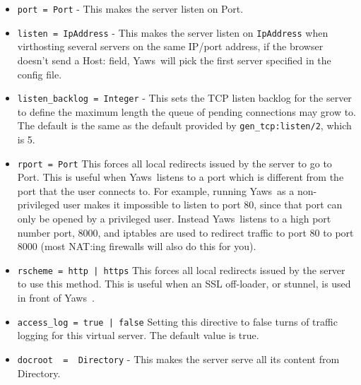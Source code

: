\documentclass[11pt,oneside,english]{book}
\newcommand{\Yaws}            %
        {{\sc Yaws}}
\begin{document}
\begin{itemize}

\item       \verb+port = Port+ -
              This makes the server listen on Port.

\item        \verb+listen = IpAddress+ -
              This makes the  server  listen  on  \verb+IpAddress+  when
              virthosting  several  servers  on  the same IP/port
              address, if the browser doesn't send a Host: field,
              \Yaws\   will  pick  the first server specified in the
              config file.

\item        \verb+listen_backlog = Integer+ -
              This sets the TCP listen backlog for the server to
              define the maximum length the queue of pending
              connections may grow to. The default is the same as
              the default provided by \verb+gen_tcp:listen/2+, which
              is 5.

\item       \verb+rport = Port+
              This forces  all  local  redirects  issued  by  the
              server  to  go  to  Port.  This is useful when \Yaws\
              listens to a port which is different from the  port
              that  the  user  connects  to. For example, running
              \Yaws\  as a non-privileged user makes  it  impossible
              to  listen  to port 80, since that port can only be
              opened by a privileged user. Instead  \Yaws\   listens
              to  a high port number port, 8000, and iptables are
              used to redirect traffic to port 80  to  port  8000
              (most NAT:ing firewalls will also do this for you).

\item       \verb+rscheme = http | https+
              This forces  all  local  redirects  issued  by  the
              server  to  use this method. This is useful when an
              SSL off-loader, or stunnel, is  used  in  front  of
              \Yaws\ .

\item       \verb+access_log = true | false+
              Setting  this  directive  to  false turns of
              traffic logging for this virtual server. The
              default value is true.

\item       \verb+docroot  =  Directory+ -
              This makes the server serve all its content from
              Directory.


\end{itemize}
\end{document}

